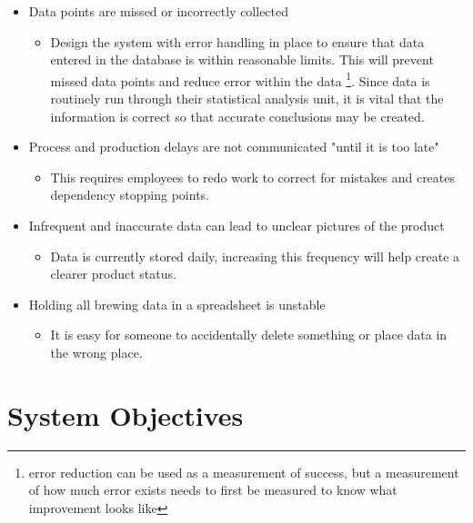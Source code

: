 \documentclass[draftclsnofoot,onecolumn,letterpaper,10pt]{IEEEtran}
\begin{document}
\begin{itemize}
	\item {Data points are missed or incorrectly collected}
      		\begin{itemize}
			\item {Design the system with error handling in place to ensure that data entered in the database is within reasonable limits.
				This will prevent missed data points and reduce error within the data \footnote{error reduction can be used as a measurement of success, but a measurement of how much error exists needs to first be measured to know what improvement looks like}.
				Since data is routinely run through their statistical analysis unit, it is vital that the information is correct so that accurate conclusions may be created.
			}
      		\end{itemize}

	\item {Process and production delays are not communicated "until it is too late"}
		\begin{itemize}
			\item {This requires employees to redo work to correct for mistakes and creates dependency stopping points.}
		\end{itemize}

	\item {Infrequent and inaccurate data can lead to unclear pictures of the product}
		\begin{itemize}
			\item {Data is currently stored daily, increasing this frequency will help create a clearer product status.}
		\end{itemize}

	\item {Holding all brewing data in a spreadsheet is unstable}
		\begin{itemize}
			\item {It is easy for someone to accidentally delete something or place data in the wrong place.}
		\end{itemize}

	\end{itemize}


\section{System Objectives}
\end{document}
